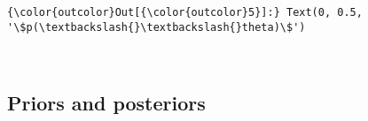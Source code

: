 \documentclass[11pt]{article}
\begin{document}
\begin{Verbatim}[commandchars=\\\{\}]
{\color{outcolor}Out[{\color{outcolor}5}]:} Text(0, 0.5, '\$p(\textbackslash{}\textbackslash{}theta)\$')
\end{Verbatim}
            
    \begin{center}
    \end{center}
    { \hspace*{\fill} \\}
    
    \hypertarget{priors-and-posteriors}{%
\subsection{Priors and posteriors}\label{priors-and-posteriors}}
\end{document}
